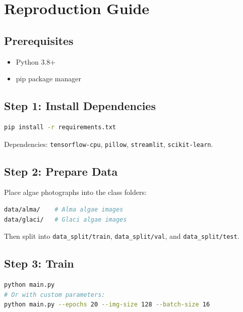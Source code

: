 \documentclass[12pt,a4paper]{article}
\begin{document}
\section{Reproduction Guide}

\subsection{Prerequisites}

\begin{itemize}
    \item Python 3.8+
    \item pip package manager
\end{itemize}

\subsection{Step 1: Install Dependencies}

\begin{lstlisting}[language=bash]
pip install -r requirements.txt
\end{lstlisting}

Dependencies: \texttt{tensorflow-cpu}, \texttt{pillow}, \texttt{streamlit}, \texttt{scikit-learn}.

\subsection{Step 2: Prepare Data}

Place algae photographs into the class folders:

\begin{lstlisting}[language=bash]
data/alma/    # Alma algae images
data/glaci/   # Glaci algae images
\end{lstlisting}

Then split into \texttt{data\_split/train}, \texttt{data\_split/val}, and \texttt{data\_split/test}.

\subsection{Step 3: Train}

\begin{lstlisting}[language=bash]
python main.py
# Or with custom parameters:
python main.py --epochs 20 --img-size 128 --batch-size 16
\end{lstlisting}
\end{document}
